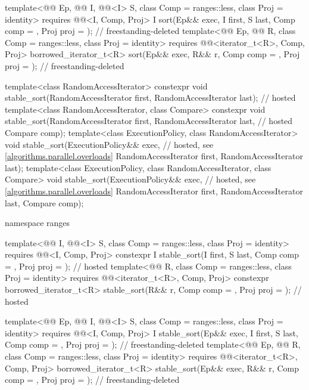 \begin{codeblock}
{{    template<@@ Ep, @@ I, @@<I> S,
             class Comp = ranges::less, class Proj = identity>
      requires @@<I, Comp, Proj>
      I sort(Ep&& exec, I first, S last, Comp comp = {}, Proj proj = {});   // freestanding-deleted
    template<@@ Ep, @@ R, class Comp = ranges::less,
             class Proj = identity>
      requires @@<iterator_t<R>, Comp, Proj>
      borrowed_iterator_t<R>
        sort(Ep&& exec, R&& r, Comp comp = {}, Proj proj = {});             // freestanding-deleted
  }

  template<class RandomAccessIterator>
    constexpr void stable_sort(RandomAccessIterator first, RandomAccessIterator last);  // hosted
  template<class RandomAccessIterator, class Compare>
    constexpr void stable_sort(RandomAccessIterator first, RandomAccessIterator last,   // hosted
                               Compare comp);
  template<class ExecutionPolicy, class RandomAccessIterator>
    void stable_sort(ExecutionPolicy&& exec,                    // hosted, see \ref{algorithms.parallel.overloads}
                     RandomAccessIterator first, RandomAccessIterator last);
  template<class ExecutionPolicy, class RandomAccessIterator, class Compare>
    void stable_sort(ExecutionPolicy&& exec,                    // hosted, see \ref{algorithms.parallel.overloads}
                     RandomAccessIterator first, RandomAccessIterator last,
                     Compare comp);

  namespace ranges {
    template<@@ I, @@<I> S, class Comp = ranges::less,
             class Proj = identity>
      requires @@<I, Comp, Proj>
      constexpr I stable_sort(I first, S last, Comp comp = {}, Proj proj = {});         // hosted
    template<@@ R, class Comp = ranges::less, class Proj = identity>
      requires @@<iterator_t<R>, Comp, Proj>
      constexpr borrowed_iterator_t<R>
        stable_sort(R&& r, Comp comp = {}, Proj proj = {});                             // hosted

    template<@@ Ep, @@ I, @@<I> S,
             class Comp = ranges::less, class Proj = identity>
      requires @@<I, Comp, Proj>
      I stable_sort(Ep&& exec, I first, S last, Comp comp = {},
                    Proj proj = {});                                        // freestanding-deleted
    template<@@ Ep, @@ R, class Comp = ranges::less,
             class Proj = identity>
      requires @@<iterator_t<R>, Comp, Proj>
      borrowed_iterator_t<R>
        stable_sort(Ep&& exec, R&& r, Comp comp = {}, Proj proj = {});      // freestanding-deleted
  }

}
\end{codeblock}
